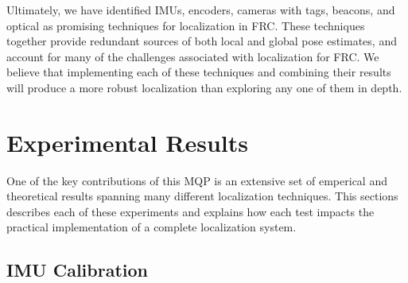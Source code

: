 \documentclass{article}
\begin{document}
  Ultimately, we have identified IMUs, encoders, cameras with tags, beacons, and optical as promising techniques for localization in FRC. These techniques together provide redundant sources of both local and global pose estimates, and account for many of the challenges associated with localization for FRC. We believe that implementing each of these techniques and combining their results will produce a more robust localization than exploring any one of them in depth.

\section{Experimental Results} \label{experiments}

  One of the key contributions of this MQP is an extensive set of emperical and theoretical results spanning many different localization techniques. This sections describes each of these experiments and explains how each test impacts the practical implementation of a complete localization system.

  \subsection{IMU Calibration} \label{section:imu_calibration}
\end{document}
